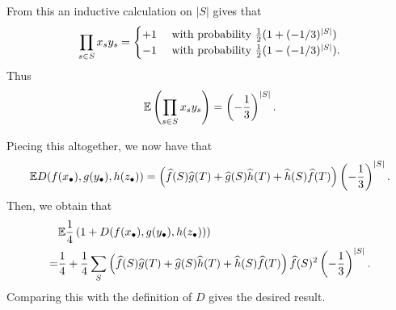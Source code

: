 \begin{problem}
\begin{sol}
\begin{itemize}
		From this an inductive calculation on $|S|$ gives that
		\[
			\prod_{s \in S} x_sy_s
			=
			\begin{cases}
				+1 & \text{ with probability } \frac{1}{2}(1+(-1/3)^{|S|}) \\
				-1 & \text{ with probability } \frac{1}{2}(1-(-1/3)^{|S|}).
			\end{cases}
		\]
		Thus
		\[ \mathbb E \left( \prod_{s \in S} x_sy_s \right) = \left( -\frac13 \right)^{|S|}.  \]
	\end{itemize}
	Piecing this altogether, we now have that
	\[
		\mathbb E D(f(x_\bullet), g(y_\bullet), h(z_\bullet))
		=
		\left( \widehat f(S) \widehat g(T) + \widehat g(S) \widehat h(T) + \widehat h(S) \widehat f(T) \right)
		\left( -\frac13 \right)^{|S|}.
	\]
	Then, we obtain that
	\begin{align*}
		&\mathbb E \frac14 \left( 1 + D(f(x_\bullet), g(y_\bullet), h(z_\bullet)) \right) \\
		=& \frac14 + \frac14\sum_S
		\left( \widehat f(S) \widehat g(T) + \widehat g(S) \widehat h(T) + \widehat h(S) \widehat f(T) \right)
		\widehat f(S)^2 \left( -\frac13 \right)^{|S|}.
	\end{align*}
	Comparing this with the definition of $D$ gives the desired result.
	\end{sol}
\end{problem}

\endinput
\section{Peter-Weyl}
In fact, if $G$ is a Lie group, even if $G$ is not abelian
we can still give an orthonormal basis of $L^2(G)$
(the square-integrable functions on $G$).
It turns out in this case the characters are attached to complex
irreducible representations of $G$
(and in what follows all representations are complex).

The result is given by the Peter-Weyl theorem.
First, we need the following result:
\begin{lemma}
	[Compact Lie groups have unitary reps]
	Any finite-dimensional (complex) representation $V$ of a compact Lie group $G$
	is unitary, meaning it can be equipped with a $G$-invariant inner form.
	Consequently, $V$ is completely reducible:
	it splits into the direct sum of irreducible representations of $G$.
\end{lemma}
\begin{proof}
	Suppose $B : V \times V \to \CC$ is any inner product.
	Equip $G$ with a right-invariant Haar measure $dg$.
	Then we can equip it with an ``averaged'' inner form
	\[ \wt B(v,w) = \int_G B(gv, gw) \; dg. \]
	Then $\wt B$ is the desired $G$-invariant inner form.
	Now, the fact that $V$ is completely reducible follows from the fact
	that given a subrepresentation of $V$, its orthogonal complement
	is also a subrepresentation.
\end{proof}

